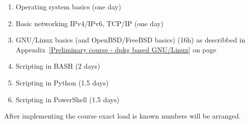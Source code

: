 \begin{enumerate}[label=LAB \arabic*.,leftmargin=*]
\item Operating system basics (one day)
\item Basic networking IPv4/IPv6, TCP/IP (one day)
\item GNU/Linux basics (and OpenBSD/FreeBSD basics) (16h) as describbed in Appendix~\ref{Preliminary course - dpkg based GNU/Linux} on page~\pageref{Preliminary course - dpkg based GNU/Linux}
\item Scripting in BASH (2 days)
\item Scripting in Python (1.5 days)
\item Scripting in PowerShell (1.5 days)
\end{enumerate}
After implementing the course exact load is known numbers will be arranged.

